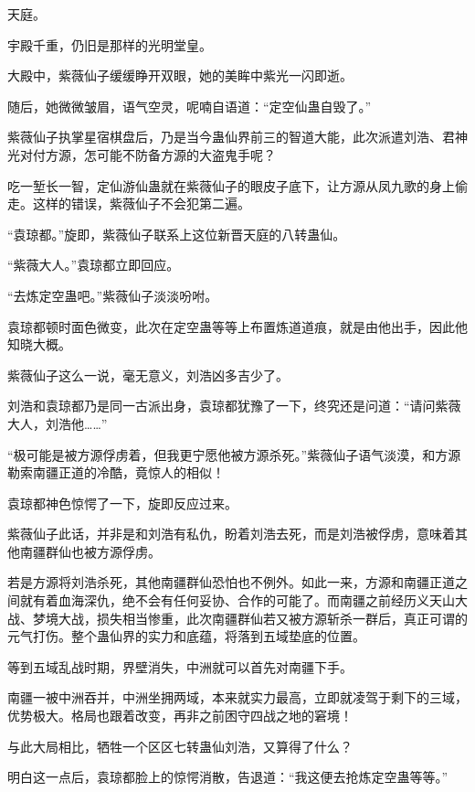 
\begin{this_body}



天庭。

宇殿千重，仍旧是那样的光明堂皇。

大殿中，紫薇仙子缓缓睁开双眼，她的美眸中紫光一闪即逝。

随后，她微微皱眉，语气空灵，呢喃自语道：“定空仙蛊自毁了。”

紫薇仙子执掌星宿棋盘后，乃是当今蛊仙界前三的智道大能，此次派遣刘浩、君神光对付方源，怎可能不防备方源的大盗鬼手呢？

吃一堑长一智，定仙游仙蛊就在紫薇仙子的眼皮子底下，让方源从凤九歌的身上偷走。这样的错误，紫薇仙子不会犯第二遍。

“袁琼都。”旋即，紫薇仙子联系上这位新晋天庭的八转蛊仙。

“紫薇大人。”袁琼都立即回应。

“去炼定空蛊吧。”紫薇仙子淡淡吩咐。

袁琼都顿时面色微变，此次在定空蛊等等上布置炼道道痕，就是由他出手，因此他知晓大概。

紫薇仙子这么一说，毫无意义，刘浩凶多吉少了。

刘浩和袁琼都乃是同一古派出身，袁琼都犹豫了一下，终究还是问道：“请问紫薇大人，刘浩他……”

“极可能是被方源俘虏着，但我更宁愿他被方源杀死。”紫薇仙子语气淡漠，和方源勒索南疆正道的冷酷，竟惊人的相似！

袁琼都神色惊愕了一下，旋即反应过来。

紫薇仙子此话，并非是和刘浩有私仇，盼着刘浩去死，而是刘浩被俘虏，意味着其他南疆群仙也被方源俘虏。

若是方源将刘浩杀死，其他南疆群仙恐怕也不例外。如此一来，方源和南疆正道之间就有着血海深仇，绝不会有任何妥协、合作的可能了。而南疆之前经历义天山大战、梦境大战，损失相当惨重，此次南疆群仙若又被方源斩杀一群后，真正可谓的元气打伤。整个蛊仙界的实力和底蕴，将落到五域垫底的位置。

等到五域乱战时期，界壁消失，中洲就可以首先对南疆下手。

南疆一被中洲吞并，中洲坐拥两域，本来就实力最高，立即就凌驾于剩下的三域，优势极大。格局也跟着改变，再非之前困守四战之地的窘境！

与此大局相比，牺牲一个区区七转蛊仙刘浩，又算得了什么？

明白这一点后，袁琼都脸上的惊愕消散，告退道：“我这便去抢炼定空蛊等等。”


\end{this_body}
